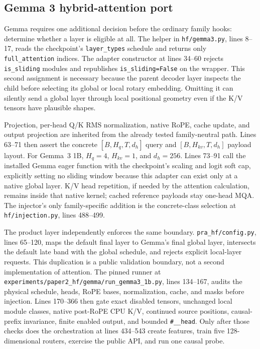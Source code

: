\documentclass[11pt]{article}
\begin{document}
\subsection{Gemma 3 hybrid-attention port}

Gemma requires one additional decision before the ordinary family hooks: determine whether a
layer is eligible at all. The helper in \texttt{hf/gemma3.py}, lines 8--17, reads the checkpoint's
\texttt{layer\_types} schedule and returns only \texttt{full\_attention} indices. The adapter
constructor at lines 34--60 rejects \texttt{is\_sliding} modules and republishes
\texttt{is\_sliding=False} on the wrapper. This second assignment is necessary because the parent
decoder layer inspects the child before selecting its global or local rotary embedding. Omitting
it can silently send a global layer through local positional geometry even if the K/V tensors
have plausible shapes.

Projection, per-head Q/K RMS normalization, native RoPE, cache update, and output projection are
inherited from the already tested family-neutral path. Lines 63--71 then assert the concrete
$[B,H_q,T,d_h]$ query and $[B,H_{kv},T,d_h]$ payload layout. For Gemma~3 1B,
$H_q=4$, $H_{kv}=1$, and $d_h=256$. Lines 73--91 call the installed Gemma eager function with
the checkpoint's scaling and logit soft cap, explicitly setting no sliding window because this
adapter can exist only at a native global layer. K/V head repetition, if needed by the attention
calculation, remains inside that native kernel; cached reference payloads stay one-head MQA.
The injector's only family-specific addition is the concrete-class selection at
\texttt{hf/injection.py}, lines 488--499.

The product layer independently enforces the same boundary. \texttt{pra\_hf/config.py}, lines
65--120, maps the default final layer to Gemma's final global layer, intersects the default late
band with the global schedule, and rejects explicit local-layer requests. This duplication is a
public validation boundary, not a second implementation of attention. The pinned runner at
\texttt{experiments/paper2\_hf/gemma/run\_gemma3\_1b.py}, lines 134--167, audits the physical
schedule, heads, RoPE bases, normalization, cache, and masks before injection. Lines 170--366
then gate exact disabled tensors, unchanged local module classes, native post-RoPE CPU K/V,
continued source positions, causal-prefix invariance, finite enabled output, and bounded
\texttt{\#\_\_head}. Only after those checks does the orchestration at lines 434--543 create
features, train five 128-dimensional routers, exercise the public API, and run one causal probe.
\end{document}
